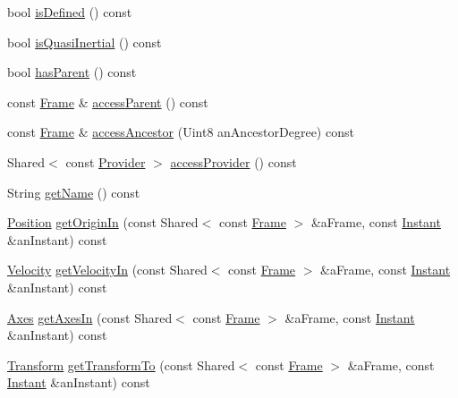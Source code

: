 \begin{DoxyCompactItemize}
bool \hyperlink{classlibrary_1_1physics_1_1coord_1_1_frame_ad5a450dd6740fc5a27473e661375dde6}{is\+Defined} () const
\item 
bool \hyperlink{classlibrary_1_1physics_1_1coord_1_1_frame_a894d1ac6152e28dbb749058ca6ffd663}{is\+Quasi\+Inertial} () const
\item 
bool \hyperlink{classlibrary_1_1physics_1_1coord_1_1_frame_afd83dec4bf4e2aabc2b31019b282965e}{has\+Parent} () const
\item 
const \hyperlink{classlibrary_1_1physics_1_1coord_1_1_frame}{Frame} \& \hyperlink{classlibrary_1_1physics_1_1coord_1_1_frame_aaa33dd0c2af00aee0ffb4278cccdc8a2}{access\+Parent} () const
\item 
const \hyperlink{classlibrary_1_1physics_1_1coord_1_1_frame}{Frame} \& \hyperlink{classlibrary_1_1physics_1_1coord_1_1_frame_a82db48e361c6804146083c7478a2528f}{access\+Ancestor} (Uint8 an\+Ancestor\+Degree) const
\item 
Shared$<$ const \hyperlink{classlibrary_1_1physics_1_1coord_1_1frame_1_1_provider}{Provider} $>$ \hyperlink{classlibrary_1_1physics_1_1coord_1_1_frame_a5da9096ace352a91d272677cc159c059}{access\+Provider} () const
\item 
String \hyperlink{classlibrary_1_1physics_1_1coord_1_1_frame_afec582db83d2bf93b2b070f8557ee760}{get\+Name} () const
\item 
\hyperlink{classlibrary_1_1physics_1_1coord_1_1_position}{Position} \hyperlink{classlibrary_1_1physics_1_1coord_1_1_frame_aa68223b40939d6dd45ace7746805d33c}{get\+Origin\+In} (const Shared$<$ const \hyperlink{classlibrary_1_1physics_1_1coord_1_1_frame}{Frame} $>$ \&a\+Frame, const \hyperlink{classlibrary_1_1physics_1_1time_1_1_instant}{Instant} \&an\+Instant) const
\item 
\hyperlink{classlibrary_1_1physics_1_1coord_1_1_velocity}{Velocity} \hyperlink{classlibrary_1_1physics_1_1coord_1_1_frame_ae7974e759c97f32ccc966cbcc3baf77c}{get\+Velocity\+In} (const Shared$<$ const \hyperlink{classlibrary_1_1physics_1_1coord_1_1_frame}{Frame} $>$ \&a\+Frame, const \hyperlink{classlibrary_1_1physics_1_1time_1_1_instant}{Instant} \&an\+Instant) const
\item 
\hyperlink{classlibrary_1_1physics_1_1coord_1_1_axes}{Axes} \hyperlink{classlibrary_1_1physics_1_1coord_1_1_frame_abd6fc9109e37433d4b223cfb291edb20}{get\+Axes\+In} (const Shared$<$ const \hyperlink{classlibrary_1_1physics_1_1coord_1_1_frame}{Frame} $>$ \&a\+Frame, const \hyperlink{classlibrary_1_1physics_1_1time_1_1_instant}{Instant} \&an\+Instant) const
\item 
\hyperlink{classlibrary_1_1physics_1_1coord_1_1_transform}{Transform} \hyperlink{classlibrary_1_1physics_1_1coord_1_1_frame_a567715e72b885f8c7ec0ab7a3d068240}{get\+Transform\+To} (const Shared$<$ const \hyperlink{classlibrary_1_1physics_1_1coord_1_1_frame}{Frame} $>$ \&a\+Frame, const \hyperlink{classlibrary_1_1physics_1_1time_1_1_instant}{Instant} \&an\+Instant) const
\end{DoxyCompactItemize}
